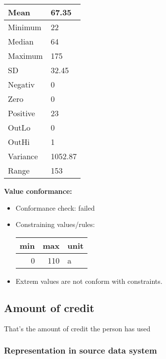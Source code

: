 \documentclass[
]{article}
\providecommand{\tightlist}{%
  \setlength{\itemsep}{0pt}\setlength{\parskip}{0pt}}
\begin{document}
\begin{table}[H]
\centering
\begin{tabular}{l|l}
\hline
Mean & 67.35\\
\hline
Minimum & 22\\
\hline
Median & 64\\
\hline
Maximum & 175\\
\hline
SD & 32.45\\
\hline
Negativ & 0\\
\hline
Zero & 0\\
\hline
Positive & 23\\
\hline
OutLo & 0\\
\hline
OutHi & 1\\
\hline
Variance & 1052.87\\
\hline
Range & 153\\
\hline
\end{tabular}
\end{table}

\textbf{Value conformance:}

\begin{itemize}
\tightlist
\item
  Conformance check: failed
\item
  Constraining values/rules:

  \begin{table}[H]
  \centering
  \begin{tabular}{r|r|l}
  \hline
  \textbf{min} & \textbf{max} & \textbf{unit}\\
  \hline
  0 & 110 & a\\
  \hline
  \end{tabular}
  \end{table}
\item
  Extrem values are not conform with constraints.
\end{itemize}

\newpage

\hypertarget{amount-of-credit}{%
\subsection{Amount of credit}\label{amount-of-credit}}

That's the amount of credit the person has used

\hypertarget{representation-in-source-data-system-1}{%
\subsubsection{\texorpdfstring{Representation in \textbf{source} data
system}{Representation in source data system}}\label{representation-in-source-data-system-1}}
\end{document}
